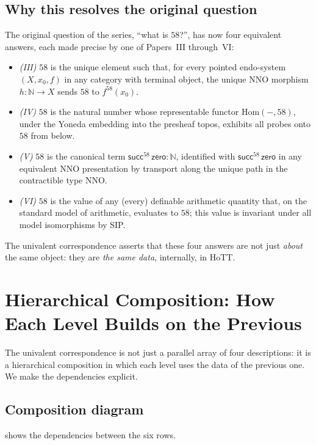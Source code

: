 \documentclass[12pt]{article}
\theoremstyle{definition}
\theoremstyle{remark}
\newcommand{\N}{\mathbb{N}}
\newcommand{\Hom}{\mathrm{Hom}}
\newcommand{\zero}{\mathsf{zero}}
\newcommand{\suc}{\mathsf{succ}}
\newcommand{\NNO}{\mathrm{NNO}}
\begin{document}
\subsection{Why this resolves the original question}

The original question of the series, ``what is $58$?'', has now four
equivalent answers, each made precise by one of Papers~III through~VI:
\begin{itemize}
\item \emph{(III)} $58$ is the unique element such that, for every pointed
endo-system $(X, x_0, f)$ in any category with terminal object, the unique
NNO morphism $h\colon \N \to X$ sends $58$ to $f^{58}(x_0)$.
\item \emph{(IV)} $58$ is the natural number whose representable functor
$\Hom(-, 58)$, under the Yoneda embedding into the presheaf topos, exhibits
all probes onto $58$ from below.
\item \emph{(V)} $58$ is the canonical term $\suc^{58}\,\zero : \N$,
identified with $\suc^{58}\,\zero$ in any equivalent NNO presentation by
transport along the unique path in the contractible type $\NNO$.
\item \emph{(VI)} $58$ is the value of any (every) definable arithmetic
quantity that, on the standard model of arithmetic, evaluates to $58$;
this value is invariant under all model isomorphisms by SIP.
\end{itemize}
The univalent correspondence asserts that these four answers are not just
\emph{about} the same object: they are \emph{the same data}, internally,
in HoTT.

\section{Hierarchical Composition: How Each Level Builds on the Previous}
\label{sec:diagrams}

The univalent correspondence is not just a parallel array of four
descriptions: it is a hierarchical composition in which each level uses
the data of the previous one. We make the dependencies explicit.

\subsection{Composition diagram}

 shows the dependencies between the six rows.
\end{document}
